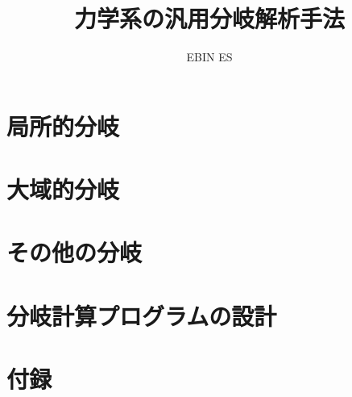\documentclass[a4paper,dvipdfmx]{jsarticle}
\begin{document}
\title{力学系の汎用分岐解析手法}

\author{EBIN ES}

\maketitle

\tableofcontents


\part{局所的分岐}
\setcounter{section}{0}




\newpage
\part{大域的分岐}
\setcounter{section}{0}
\newpage
\part{その他の分岐}
\setcounter{section}{0}

\newpage
\part{分岐計算プログラムの設計}
\setcounter{section}{0}
\newpage
\part{付録}
\setcounter{section}{0}

\newpage


\end{document}
